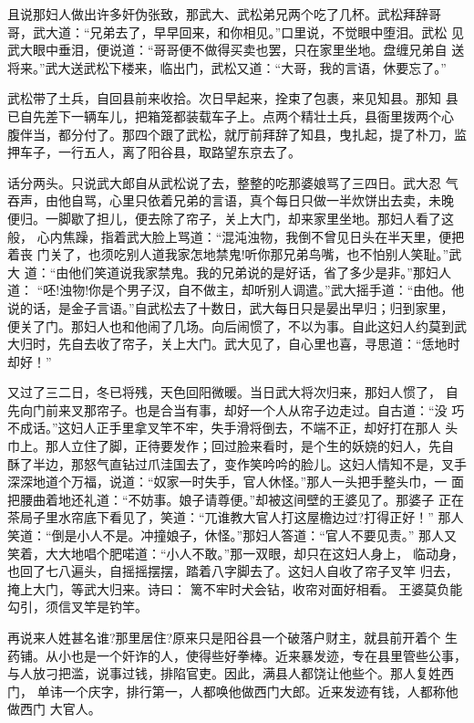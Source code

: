 且说那妇人做出许多奸伪张致，那武大、武松弟兄两个吃了几杯。武松拜辞哥
哥，武大道：“兄弟去了，早早回来，和你相见。”口里说，不觉眼中堕泪。武松
见武大眼中垂泪，便说道：“哥哥便不做得买卖也罢，只在家里坐地。盘缠兄弟自
送将来。”武大送武松下楼来，临出门，武松又道：“大哥，我的言语，休要忘了。”

武松带了土兵，自回县前来收拾。次日早起来，拴束了包裹，来见知县。那知
县已自先差下一辆车儿，把箱笼都装载车子上。点两个精壮土兵，县衙里拨两个心
腹伴当，都分付了。那四个跟了武松，就厅前拜辞了知县，曳扎起，提了朴刀，监
押车子，一行五人，离了阳谷县，取路望东京去了。

话分两头。只说武大郎自从武松说了去，整整的吃那婆娘骂了三四日。武大忍
气吞声，由他自骂，心里只依着兄弟的言语，真个每日只做一半炊饼出去卖，未晚
便归。一脚歇了担儿，便去除了帘子，关上大门，却来家里坐地。那妇人看了这般，
心内焦躁，指着武大脸上骂道：“混沌浊物，我倒不曾见日头在半天里，便把着丧
门关了，也须吃别人道我家怎地禁鬼!听你那兄弟鸟嘴，也不怕别人笑耻。”武大
道：“由他们笑道说我家禁鬼。我的兄弟说的是好话，省了多少是非。”那妇人道：
“呸!浊物!你是个男子汉，自不做主，却听别人调遣。”武大摇手道：“由他。他
说的话，是金子言语。”自武松去了十数日，武大每日只是晏出早归；归到家里，
便关了门。那妇人也和他闹了几场。向后闹惯了，不以为事。自此这妇人约莫到武
大归时，先自去收了帘子，关上大门。武大见了，自心里也喜，寻思道：“恁地时
却好！”

又过了三二日，冬已将残，天色回阳微暖。当日武大将次归来，那妇人惯了，
自先向门前来叉那帘子。也是合当有事，却好一个人从帘子边走过。自古道：“没
巧不成话。”这妇人正手里拿叉竿不牢，失手滑将倒去，不端不正，却好打在那人
头巾上。那人立住了脚，正待要发作；回过脸来看时，是个生的妖娆的妇人，先自
酥了半边，那怒气直钻过爪洼国去了，变作笑吟吟的脸儿。这妇人情知不是，叉手
深深地道个万福，说道：“奴家一时失手，官人休怪。”那人一头把手整头巾，一
面把腰曲着地还礼道：“不妨事。娘子请尊便。”却被这间壁的王婆见了。那婆子
正在茶局子里水帘底下看见了，笑道：“兀谁教大官人打这屋檐边过?打得正好！”
那人笑道：“倒是小人不是。冲撞娘子，休怪。”那妇人答道：“官人不要见责。”
那人又笑着，大大地唱个肥喏道：“小人不敢。”那一双眼，却只在这妇人身上，
临动身，也回了七八遍头，自摇摇摆摆，踏着八字脚去了。这妇人自收了帘子叉竿
归去，掩上大门，等武大归来。诗曰：
篱不牢时犬会钻，收帘对面好相看。
王婆莫负能勾引，须信叉竿是钓竿。

再说来人姓甚名谁?那里居住?原来只是阳谷县一个破落户财主，就县前开着个
生药铺。从小也是一个奸诈的人，使得些好拳棒。近来暴发迹，专在县里管些公事，
与人放刁把滥，说事过钱，排陷官吏。因此，满县人都饶让他些个。那人复姓西门，
单讳一个庆字，排行第一，人都唤他做西门大郎。近来发迹有钱，人都称他做西门
大官人。

